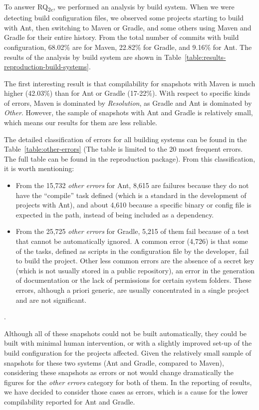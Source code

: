 To answer RQ\textsubscript{2c}, we performed an analysis by build system. When we were detecting build configuration files, we observed some projects starting to build with Ant, then switching to Maven or Gradle, and some others using Maven and Gradle for their entire history. From the total number of commits with build configuration, 68.02\% are for Maven, 22.82\% for Gradle, and 9.16\% for Ant. The results of the analysis by build system are shown in Table~\ref{table:results-reproduction-build-systems}.

The first interesting result is that compilability for snapshots with Maven is much higher (42.03\%) than for Ant or Gradle (17-22\%). With respect to specific kinds of errors, Maven is dominated by \textit{Resolution}, as Gradle and Ant is dominated by \textit{Other}. However, the sample of snapshots with Ant and Gradle is relatively small, which means our results for them are less reliable.

The detailed classification of errors for all building systems can be found in the Table~\ref{table:other-errors} (The table is limited to the 20 most frequent errors. The full table can be found in the reproduction package). 
From this classification, it is worth mentioning:
\begin{itemize}
 \item From the 15,732 \textit{other errors} for Ant, 8,615 are failures because they do not have the ``compile'' task defined (which is a standard in the development of projects with Ant), and about 4,610 because a specific binary or config file is expected in the path, instead of being included as a dependency.
 \item From the 25,725 \textit{other errors} for Gradle, 5,215 of them fail because of a test that cannot be automatically ignored. A common error (4,726) is that some of the tasks, defined as scripts in the configuration file by the developer, fail to build the project. Other less common errors are the absence of a secret key (which is not usually stored in a public repository), an error in the generation of documentation or the lack of permissions for certain system folders. These errors, although a priori generic, are usually concentrated in a single project and are not significant.
\end{itemize}. 

Although all of these snapshots could not be built automatically, they could be built with minimal human intervention, or with a slightly improved set-up of the build configuration for the projects affected. Given the relatively small sample of snapshots for these two systems (Ant and Gradle, compared to Maven), considering these snapshots as errors or not would change dramatically the figures for the \textit{other errors} category for both of them. In the reporting of results, we have decided to consider those cases as errors, which is a cause for the lower compilability reported for Ant and Gradle.

